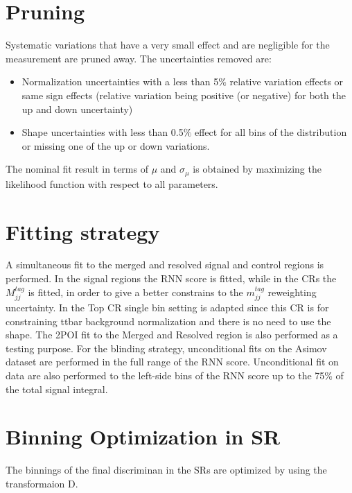 \section{Pruning}
Systematic variations that have a very small effect and are negligible for the measurement are pruned away. The uncertainties removed are:
  \begin{itemize}
   \item  Normalization uncertainties with a less than 5$\%$ relative variation effects or same sign effects (relative variation being positive (or negative) for both the up and down uncertainty)
   \item  Shape uncertainties with less than 0.5$\%$ effect for all bins of the distribution or missing one of the up or down variations.
    \end{itemize}
    
The nominal fit result in terms of $\mu$ and $\sigma_{\mu}$ is obtained by maximizing the likelihood function with respect to all parameters.

\section{Fitting strategy}
A simultaneous fit to the merged and resolved signal and control regions is performed. In the signal regions the RNN score is fitted, while in the CRs the $M^{tag}_{jj}$ is fitted, in order to give a better constrains to the $m^{tag}_{jj}$ reweighting uncertainty. In the Top CR single bin setting is adapted since this CR is for constraining ttbar background normalization and there is no need to use the shape. 
The 2POI fit to the Merged and Resolved region is also performed as a testing purpose. For the blinding strategy, unconditional fits on the Asimov dataset are performed in the full range of the RNN score. Unconditional fit on data are also performed to the left-side bins of the RNN score up to the 75\% of the total signal integral.

\section{Binning Optimization in SR}
The binnings of the final discriminan in the SRs are optimized by using the transformaion D. %


